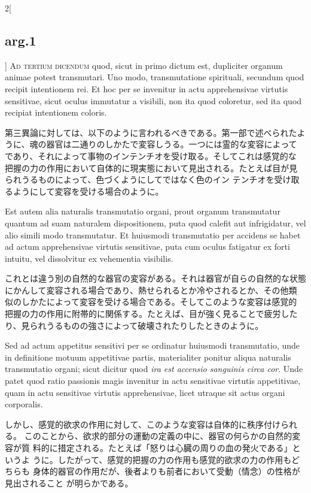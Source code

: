 \documentclass[paper=a4paper,fontsize=10pt,jafontsize=9pt,titlepage]{jlreq}
\begin{document}
\begin{paracol}{2}[\subsection{arg.1}]
{\scshape Ad tertium dicendum} quod, sicut in primo dictum est, dupliciter organum
 animae potest transmutari. Uno modo, transmutatione spirituali,
 secundum quod recipit intentionem rei. Et hoc per se invenitur in actu
 apprehensivae virtutis sensitivae, sicut oculus immutatur a visibili,
 non ita quod coloretur, sed ita quod recipiat intentionem coloris.

\switchcolumn

第三異論に対しては、以下のように言われるべきである。第一部で述べられたよ
 うに、魂の器官は二通りのしかたで変容しうる。一つには霊的な変容によって
 であり、それによって事物のインテンチオを受け取る。そしてこれは感覚的な
 把握の力の作用において自体的に現実態において見出される。たとえば目が見
 られうるものによって、色づくようにしてではなく色のイン
 テンチオを受け取るようにして変容を受ける場合のように。

\switchcolumn*

Est
 autem alia naturalis transmutatio organi, prout organum transmutatur
 quantum ad suam naturalem dispositionem, puta quod calefit aut
 infrigidatur, vel alio simili modo transmutatur. Et huiusmodi
 transmutatio per accidens se habet ad actum apprehensivae virtutis
 sensitivae, puta cum oculus fatigatur ex forti intuitu, vel dissolvitur
 ex vehementia visibilis.

\switchcolumn

これとは違う別の自然的な器官の変容がある。それは器官が自らの自然的な状態
 にかんして変容される場合であり、熱せられるとか冷やされるとか、その他類
 似のしかたによって変容を受ける場合である。そしてこのような変容は感覚的
 把握の力の作用に附帯的に関係する。たとえば、目が強く見ることで疲労した
 り、見られうるものの強さによって破壊されたりしたときのように。

\switchcolumn*

Sed ad actum appetitus sensitivi per se
 ordinatur huiusmodi transmutatio, unde in definitione motuum
 appetitivae partis, materialiter ponitur aliqua naturalis transmutatio
 organi; sicut dicitur quod {\itshape ira est accensio sanguinis circa cor}. Unde
 patet quod ratio passionis magis invenitur in actu sensitivae virtutis
 appetitivae, quam in actu sensitivae virtutis apprehensivae, licet
 utraque sit actus organi corporalis.

\switchcolumn

しかし、感覚的欲求の作用に対して、このような変容は自体的に秩序付けられる。
このことから、欲求的部分の運動の定義の中に、器官の何らかの自然的変容が質
 料的に措定される。たとえば「怒りは心臓の周りの血の発火である」というよ
 うに。したがって、感覚的把握の力の作用も感覚的欲求の力の作用もどちらも
 身体的器官の作用だが、後者よりも前者において受動（情念）の性格が見出されること
 が明らかである。

\end{paracol}
\newpage
{}
{}
\setcounter{section}{3}
\setcounter{subsection}{0}
\end{document}
